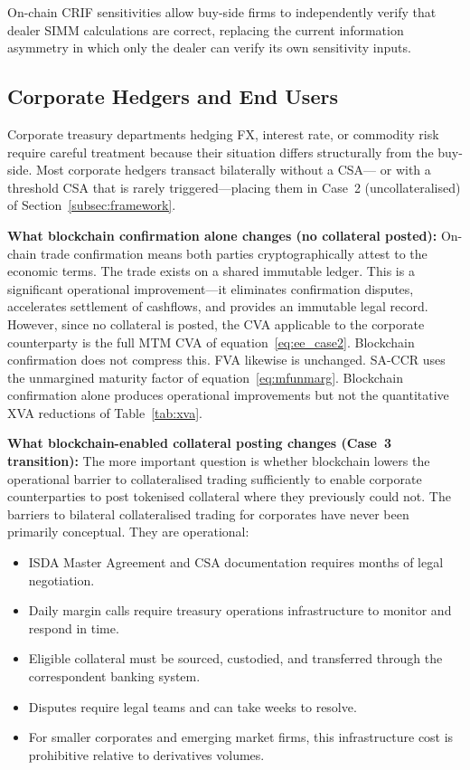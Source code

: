 \documentclass[12pt,letterpaper]{article}
\numberwithin{equation}{section}
\theoremstyle{remark}
\begin{document}
On-chain CRIF sensitivities allow buy-side firms to independently verify
that dealer SIMM calculations are correct, replacing the current information
asymmetry in which only the dealer can verify its own sensitivity inputs.

\subsection{Corporate Hedgers and End Users}
\label{subsec:corporates}

Corporate treasury departments hedging FX, interest rate, or commodity risk
require careful treatment because their situation differs structurally from
the buy-side. Most corporate hedgers transact bilaterally without a CSA---
or with a threshold CSA that is rarely triggered---placing them in Case~2
(uncollateralised) of Section~\ref{subsec:framework}.

\textbf{What blockchain confirmation alone changes (no collateral posted):}
On-chain trade confirmation means both parties cryptographically attest to
the economic terms. The trade exists on a shared immutable ledger. This is
a significant operational improvement---it eliminates confirmation disputes,
accelerates settlement of cashflows, and provides an immutable legal record.
However, since no collateral is posted, the CVA applicable to the corporate
counterparty is the full MTM CVA of equation~\eqref{eq:ee_case2}.
Blockchain confirmation does not compress this. FVA likewise is unchanged.
SA-CCR uses the unmargined maturity factor of equation~\eqref{eq:mfunmarg}.
Blockchain confirmation alone produces operational improvements but not
the quantitative XVA reductions of Table~\ref{tab:xva}.

\textbf{What blockchain-enabled collateral posting changes (Case~3
transition):}
The more important question is whether blockchain lowers the operational
barrier to collateralised trading sufficiently to enable corporate
counterparties to post tokenised collateral where they previously could not.
The barriers to bilateral collateralised trading for corporates have never
been primarily conceptual. They are operational:

\begin{itemize}[leftmargin=2em,itemsep=3pt]
  \item ISDA Master Agreement and CSA documentation requires months of
    legal negotiation.
  \item Daily margin calls require treasury operations infrastructure to
    monitor and respond in time.
  \item Eligible collateral must be sourced, custodied, and transferred
    through the correspondent banking system.
  \item Disputes require legal teams and can take weeks to resolve.
  \item For smaller corporates and emerging market firms, this infrastructure
    cost is prohibitive relative to derivatives volumes.
\end{itemize}
\end{document}
